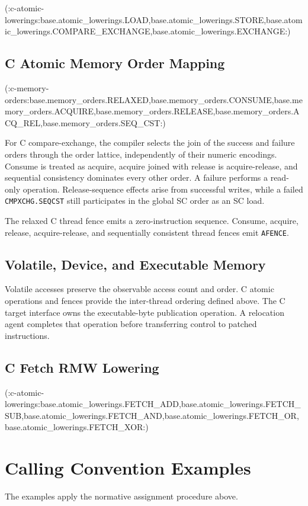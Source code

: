 \documentclass[10pt,twoside]{article}
\begin{document}
(:c-atomic-lowerings:base.atomic_lowerings.LOAD,base.atomic_lowerings.STORE,base.atomic_lowerings.COMPARE_EXCHANGE,base.atomic_lowerings.EXCHANGE:)

\Needspace{2.6in}
\subsection{C Atomic Memory Order Mapping}
(:c-memory-orders:base.memory_orders.RELAXED,base.memory_orders.CONSUME,base.memory_orders.ACQUIRE,base.memory_orders.RELEASE,base.memory_orders.ACQ_REL,base.memory_orders.SEQ_CST:)

For C compare-exchange, the compiler selects the join of the success and
failure orders through the order lattice, independently of their numeric encodings. Consume is
treated as acquire, acquire joined with release is acquire-release, and
sequential consistency dominates every other order. A failure performs a
read-only operation. Release-sequence effects arise from successful writes,
while a failed
\texttt{CMPXCHG.SEQCST} still participates in the global SC order as an SC
load.

The relaxed C thread fence emits a zero-instruction sequence. Consume,
acquire, release, acquire-release, and sequentially consistent thread fences
emit \texttt{AFENCE}.

\subsection{Volatile, Device, and Executable Memory}
Volatile accesses preserve the observable access count and order. C atomic
operations and fences provide the inter-thread ordering defined above.
The C target interface owns the executable-byte publication operation. A
relocation agent completes that operation before transferring control to
patched instructions.

\Needspace{2.0in}
\subsection{C Fetch RMW Lowering}
(:c-atomic-lowerings:base.atomic_lowerings.FETCH_ADD,base.atomic_lowerings.FETCH_SUB,base.atomic_lowerings.FETCH_AND,base.atomic_lowerings.FETCH_OR,base.atomic_lowerings.FETCH_XOR:)

\clearpage
\section{Calling Convention Examples}\label{page:calling-convention-examples}
The examples apply the normative assignment procedure above.
\end{document}
